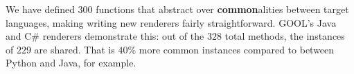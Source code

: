 \documentclass[sigplan,screen,10pt]{acmart}
\newcommand{\Csharp}{C\#}
\newcommand{\abbrev}[1]{\textbf{#1}}
\newcommand{\common}{\abbrev{common}}
\begin{document}
We have defined $300$ functions that abstract over 
\common alities between target languages, making writing new renderers
fairly straightforward. GOOL's Java and \Csharp{} renderers 
demonstrate this: out of the $328$ total methods,
the instances of $229$ are shared. That is
$40\%$ more common instances compared to between Python and Java, for example.

\end{document}

